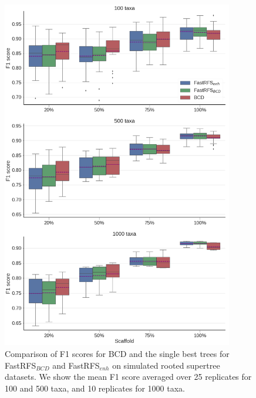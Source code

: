 \begin{figure}
  \centering
  \includegraphics[width=0.9\textwidth,height=0.8\textheight,keepaspectratio]{siesta-supp-figs/fastrfs_nosiesta_smidgenOG_f1}
  \caption[Comparison of F1 scores for  BCD and the single best trees for FastRFS$_{BCD}$ and FastRFS$_{enh}$ on simulated
    rooted supertree datasets.]{Comparison of F1 scores for  BCD and the single best trees for FastRFS$_{BCD}$ and FastRFS$_{enh}$ on simulated
    rooted supertree datasets. We show the mean F1 score
    averaged over 25 replicates for 100 and 500 taxa, and 10
    replicates for 1000 taxa.}
  \label{fig:supertree-consensus-comparison-7}
\end{figure}




